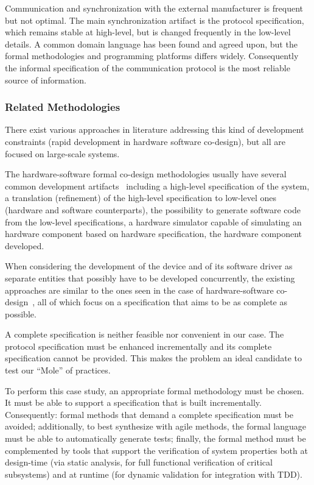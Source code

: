 \documentclass{article}
\begin{document}
Communication and synchronization with the external manufacturer is frequent but not optimal.  
The main synchronization artifact is the protocol specification, which remains stable at high-level, but is changed frequently in the low-level details.  
A common domain language has been found and agreed upon, but the formal methodologies and programming platforms differs widely.  
Consequently the informal specification of the communication protocol is the most reliable source of information.



\subsubsection{Related Methodologies}
\label{sec:relat-meth}

There exist various approaches in literature addressing this kind of development constraints (rapid development in hardware software co-design), but all are focused on large-scale systems.  

The hardware-software formal co-design methodologies usually have several common development artifacts~\cite{Slomka2000, Hoffman2001} including a high-level specification of the system, a translation (refinement) of the high-level specification to low-level ones (hardware and software counterparts), the possibility to generate software code from the low-level specifications, a hardware simulator capable of simulating an hardware component based on hardware specification, the hardware component developed.

When considering the development of the device and of its software driver as separate entities that possibly have to be developed concurrently, the existing approaches are similar to the ones seen in the case of hardware-software co-design~\cite{Valderrama1995,Siegmund2002,Ryzhyk2009}, all of which focus on a specification that aims to be as complete as possible.

A complete specification is neither feasible nor convenient in our case. 
The protocol specification must be enhanced incrementally and its complete specification cannot be provided.  
This makes the problem an ideal candidate to test our ``Mole'' of practices.

To perform this case study, an appropriate formal methodology must be chosen.  
It must be able to support a specification that is built incrementally.  
Consequently: formal methods that demand a complete specification must be avoided; additionally, to best synthesize with agile methods, the formal language must be able to automatically generate tests; finally, the formal method must be complemented by tools that support the verification of system properties both at design-time (via static analysis, for full functional verification of critical subsystems) and at runtime (for dynamic validation for integration with TDD).
\end{document}
